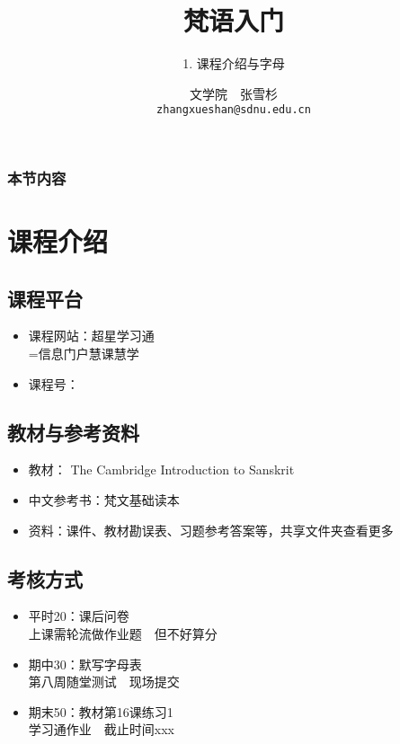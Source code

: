 \documentclass[17pt]{beamer}
\title[课程介绍与字母]{{梵语入门}}
\subtitle{1. 课程介绍与字母}
\author[张雪杉]{文学院~~张雪杉 \\ \texttt{zhangxueshan@sdnu.edu.cn}}
\date{}
\begin{document}
	


\begin{frame}
  \titlepage
\end{frame}

\begin{frame}
  \frametitle{本节内容}
  \tableofcontents
\end{frame}

\section{课程介绍}
\begin{frame}{\insertsection }
    \tableofcontents[currentsection]
\end{frame}

\subsection{课程平台}
\begin{frame}{\insertsubsection }
  \begin{itemize}
    \item
      课程网站：超星学习通\\ =信息门户慧课慧学
    \item
      课程号：
  \end{itemize}
\end{frame}

\subsection{教材与参考资料}
\begin{frame}{\insertsubsection }
  \begin{itemize}
    \item
      教材： The Cambridge Introduction to Sanskrit
    \item
      中文参考书：梵文基础读本
    \item
      资料：课件、教材勘误表、习题参考答案等，共享文件夹查看更多
  \end{itemize}
\end{frame}

\subsection{考核方式}
\begin{frame}{\insertsubsection }
  \begin{itemize}
    \item
      平时20：课后问卷\\ 上课需轮流做作业题~~但不好算分
    \item
      期中30：默写字母表\\第八周随堂测试~~现场提交
    \item
      期末50：教材第16课练习1\\学习通作业~~截止时间xxx
  \end{itemize}
\end{frame}
\end{document}
